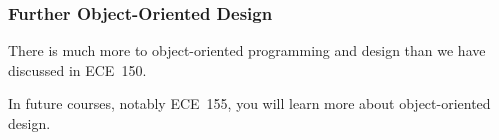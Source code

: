 \begin{frame}
\frametitle{Further Object-Oriented Design}

There is much more to object-oriented programming and design than we have discussed in ECE~150.

In future courses, notably ECE~155, you will learn more about object-oriented design.



\end{frame}






